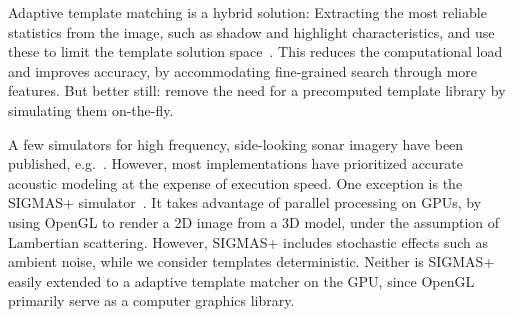 







Adaptive template matching is a hybrid solution: Extracting the most reliable statistics from the image, such as shadow and highlight characteristics, and use these to limit the template solution space~\cite{Midelfart2010}. This reduces the computational load and improves accuracy, by accommodating fine-grained search through more features. But better still: remove the need for a precomputed template library by simulating them on-the-fly.



%

%
A few simulators for high frequency, side-looking sonar imagery have been published, e.g.~\cite{Bell1997,Sammelm2003}. However, most implementations have prioritized accurate acoustic modeling at the expense of execution speed. One exception is the SIGMAS+ simulator~\cite{Coiras2009a, Coiras2009b}. It takes advantage of parallel processing on GPUs, by using OpenGL to render a 2D image from a 3D model, under the assumption of Lambertian scattering. However, SIGMAS+ includes stochastic effects such as ambient noise, while we consider templates deterministic. Neither is SIGMAS+ easily extended to a adaptive template matcher on the GPU, since OpenGL primarily serve as a computer graphics library.

